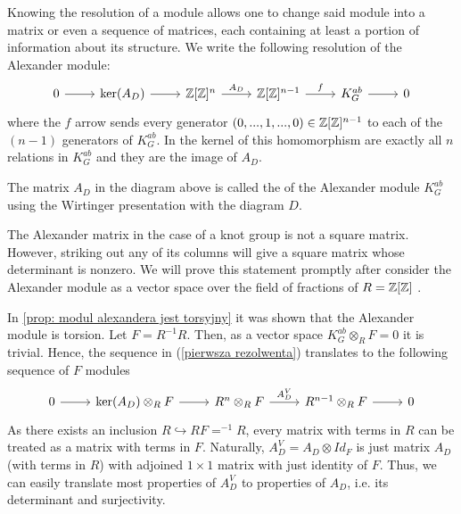 Knowing the resolution of a module allows one to change said module into a matrix or even a sequence of matrices, each containing at least a portion of information about its structure.
We write the following resolution of the Alexander module:
\begin{equation}\label{pierwsza rezolwenta}
  \begin{tikzcd}
    0\arrow[r] & \ker(A_D)\arrow[r] & \Z[\Z]^{n}\arrow[r, "A_D"] & \Z[\Z]^{n-1}\arrow[r, "f"] & K_G^{ab}\arrow[r] & 0
  \end{tikzcd}
\end{equation}
where the $f$ arrow sends every generator $(0,..., 1,...,0)\in\operatorname{\mathbb{Z}}[\operatorname{\mathbb{Z}}]^{n-1}$ to each of the $(n-1)$ generators of $K_G^{ab}$. In the kernel of this homomorphism are exactly all $n$ relations in $K_G^{ab}$ and they are the image of $A_D$.

\begin{definition}\label{alexander matrix def}
  The matrix $A_D$ in the diagram above is called the  of the Alexander module $K_G^{ab}$ using the Wirtinger presentation with the diagram $D$.
\end{definition}

The Alexander matrix in the case of a knot group is not a square matrix. However, striking out any of its columns will give a square matrix whose determinant is nonzero. We will prove this statement promptly after consider the Alexander module as a vector space over the field of fractions of $R=\operatorname{\mathbb{Z}}[\operatorname{\mathbb{Z}}]$ \cite[Chapter~3]{atiyah}.

In \cref{prop: modul alexandera jest torsyjny} it was shown that the Alexander module is torsion. Let $F=R^{-1}R$. Then, as a vector space $K_G^{ab}\otimes_R F=0$ it is trivial. Hence, the sequence in (\ref{pierwsza rezolwenta}) translates to the following sequence of $F$ modules
\begin{equation}\label{resolution vector spaces}
  \begin{tikzcd}
    0\arrow[r] & \ker(A_D)\otimes_RF \arrow[r] & R^n\otimes_R F \arrow[r, "A_D^V"] & R^{n-1}\otimes_R F \arrow[r] & 0
  \end{tikzcd}
\end{equation}
As there exists an inclusion $R\hookrightarrow RF=^{-1}R$, every matrix with terms in $R$ can be treated as a matrix with terms in $F$. Naturally, $A_D^V=A_D\otimes Id_{F}$ is just matrix $A_D$ (with terms in $R$) with adjoined $1\times 1$ matrix with just identity of $F$. Thus, we can easily translate most properties of $A_D^V$ to properties of $A_D$, i.e. its determinant and surjectivity.%

